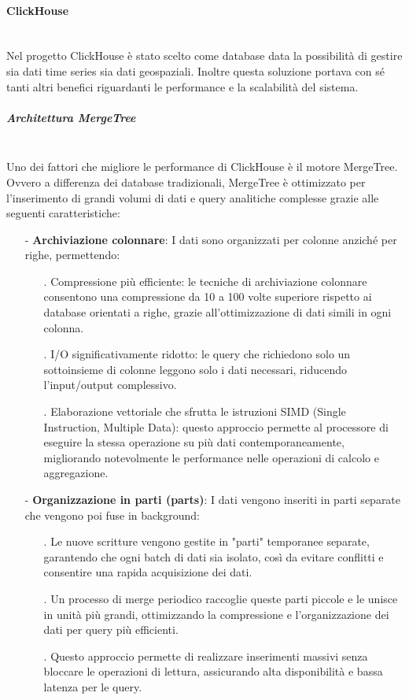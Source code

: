 \documentclass[10pt]{article}
\newcommand{\myparagraph}[1]{\paragraph{#1}\mbox{}\\}
\newcommand{\mysubparagraph}[1]{\subparagraph{#1}\mbox{}\\}
\begin{document}
        \myparagraph{ClickHouse}
        Nel progetto ClickHouse è stato scelto come database data la possibilità di gestire sia dati time series sia dati geospaziali.
        Inoltre questa soluzione portava con sé tanti altri benefici riguardanti le performance e la scalabilità del sistema.

        \mysubparagraph{Architettura MergeTree}
        Uno dei fattori che migliore le performance di ClickHouse è il motore MergeTree.
        Ovvero a differenza dei database tradizionali, MergeTree è ottimizzato per l'inserimento di grandi volumi di dati e query analitiche complesse grazie alle seguenti caratteristiche:

        \begin{itemize}
            \item[-] \textbf{Archiviazione colonnare}: I dati sono organizzati per colonne anziché per righe, permettendo:
            \begin{itemize}
                \item[.] Compressione più efficiente: le tecniche di archiviazione colonnare consentono una compressione da 10 a 100 volte superiore rispetto ai database orientati a righe, grazie all'ottimizzazione di dati simili in ogni colonna.
                \item[.] I/O significativamente ridotto: le query che richiedono solo un sottoinsieme di colonne leggono solo i dati necessari, riducendo l’input/output complessivo.
                \item[.] Elaborazione vettoriale che sfrutta le istruzioni SIMD (Single Instruction, Multiple Data): questo approccio permette al processore di eseguire la stessa operazione su più dati contemporaneamente, migliorando notevolmente le performance nelle operazioni di calcolo e aggregazione.
            \end{itemize}

            \item[-] \textbf{Organizzazione in parti (parts)}: I dati vengono inseriti in parti separate che vengono poi fuse in background:
            \begin{itemize}
                \item[.] Le nuove scritture vengono gestite in "parti" temporanee separate, garantendo che ogni batch di dati sia isolato, così da evitare conflitti e consentire una rapida acquisizione dei dati.
                \item[.] Un processo di merge periodico raccoglie queste parti piccole e le unisce in unità più grandi, ottimizzando la compressione e l'organizzazione dei dati per query più efficienti.
                \item[.] Questo approccio permette di realizzare inserimenti massivi senza bloccare le operazioni di lettura, assicurando alta disponibilità e bassa latenza per le query.
            \end{itemize}


\end{itemize}
\end{document}
